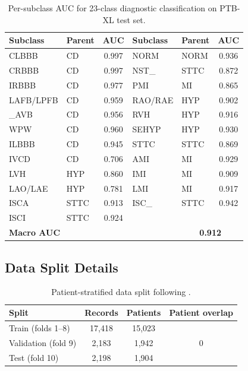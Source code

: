 \documentclass[10pt]{article}
\begin{document}
\begin{table}[h]
\caption{Per-subclass AUC for 23-class diagnostic classification on PTB-XL test set.}
\label{tab:subclass}
\begin{center}
\small
\begin{tabular}{llc|llc}
\toprule
Subclass & Parent & AUC & Subclass & Parent & AUC \\
\midrule
CLBBB & CD & 0.997 & NORM & NORM & 0.936 \\
CRBBB & CD & 0.997 & NST\_ & STTC & 0.872 \\
IRBBB & CD & 0.977 & PMI & MI & 0.865 \\
LAFB/LPFB & CD & 0.959 & RAO/RAE & HYP & 0.902 \\
\_AVB & CD & 0.956 & RVH & HYP & 0.916 \\
WPW & CD & 0.960 & SEHYP & HYP & 0.930 \\
ILBBB & CD & 0.945 & STTC & STTC & 0.869 \\
IVCD & CD & 0.706 & AMI & MI & 0.929 \\
LVH & HYP & 0.860 & IMI & MI & 0.909 \\
LAO/LAE & HYP & 0.781 & LMI & MI & 0.917 \\
ISCA & STTC & 0.913 & ISC\_ & STTC & 0.942 \\
ISCI & STTC & 0.924 & & & \\
\midrule
\multicolumn{4}{l}{\textbf{Macro AUC}} & \multicolumn{2}{c}{\textbf{0.912}} \\
\bottomrule
\end{tabular}
\end{center}
\end{table}

\subsection{Data Split Details}

\begin{table}[h]
\caption{Patient-stratified data split following \citet{strodthoff2021benchmarking}.}
\label{tab:split}
\begin{center}
\begin{tabular}{lccc}
\toprule
Split & Records & Patients & Patient overlap \\
\midrule
Train (folds 1--8) & 17,418 & 15,023 & \multirow{3}{*}{0} \\
Validation (fold 9) & 2,183 & 1,942 & \\
Test (fold 10) & 2,198 & 1,904 & \\
\bottomrule
\end{tabular}
\end{center}
\end{table}
\end{document}
